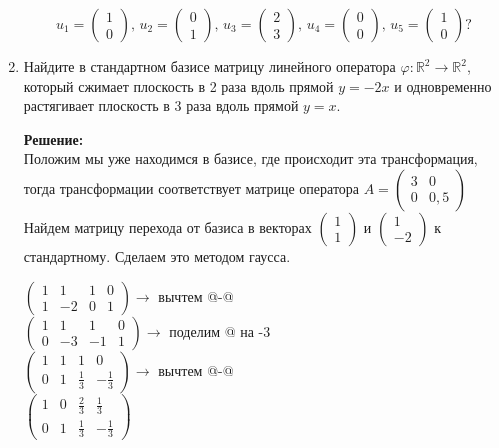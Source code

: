 \documentclass[a4paper,12pt]{article}
\makeatletter
\newcommand*{\rom}[1]{\expandafter\@slowromancap\romannumeral #1@}
\makeatother
\begin{document}
\begin{enumerate}
\[
u_1 = 
\begin{pmatrix}
{1}\\{0}
\end{pmatrix},\,
u_2 = 
\begin{pmatrix}
{0}\\{1}
\end{pmatrix},\,
u_3 = 
\begin{pmatrix}
{2}\\{3}
\end{pmatrix},\,
u_4 = 
\begin{pmatrix}
{0}\\{0}
\end{pmatrix},\,
u_5 = 
\begin{pmatrix}
{1}\\{0}
\end{pmatrix}?
\]

\vspace{5pt}

\item Найдите в стандартном базисе матрицу линейного оператора $\varphi\colon \mathbb R^2\to \mathbb R^2$, который сжимает плоскость в 2 раза вдоль прямой $y = -2x$ и одновременно растягивает плоскость в 3 раза вдоль прямой $y = x$.

\vspace{5pt}


\textbf{Решение:}\\
Положим мы  уже находимся в базисе, где происходит эта трансформация, тогда трансформации соответствует матрице оператора  $A = \begin{pmatrix}{3}&{0}\\{0}&{0,5}\end{pmatrix}$
Найдем матрицу перехода от базиса в векторах $\begin{pmatrix}
{1}\\{1}
\end{pmatrix}$ и $\begin{pmatrix}
{1}\\{-2}
\end{pmatrix}$ к стандартному. Сделаем это методом гаусса.

$
\left(\begin{array}{cc|cc}  
1&1&1&0\\
1&-2&0&1
\end{array}\right) \rightarrow$ вычтем \rom{2}-\rom{1} \\
$
\left(\begin{array}{cc|cc}  
1&1&1&0\\
0&-3&-1&1
\end{array}\right) \rightarrow$ поделим \rom{2} на -3 \\
$
\left(\begin{array}{cc|cc}  
1&1&1&0\\
0&1&\frac{1}{3}&-\frac{1}{3}
\end{array}\right) \rightarrow$ вычтем \rom{1}-\rom{2} \\
$
\left(\begin{array}{cc|cc}  
1&0&\frac{2}{3}&\frac{1}{3}\\
0&1&\frac{1}{3}&-\frac{1}{3}
\end{array}\right)$


\end{enumerate}
\end{document}
